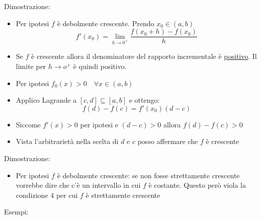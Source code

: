 Dimostrazione:
\begin{itemize}
	\item Per ipotesi $f$ è debolmente crescente. Prendo $x_0 \in  \left( a,b \right) $ 
	\[
	f'\left( x_0 \right) = \lim_{h \to 0^{+}} \frac{f\left( x_0+h \right) -f\left( x_0 \right)}{h}  
	\] 
	\item Se $f$ è crescente allora il denominatore del rapporto incrementale è \underline{positivo}. Il limite per $h \to o^{+}$ è quindi positivo.
\end{itemize}
\hr
\begin{itemize}
	\item Per ipotesi $f_0\left( x \right) > 0 \quad  \forall x \in  \left( a,b \right) $
	\item Applico Lagrande a $\left[ c,d \right] \subseteq \left[ a,b \right] $ e ottengo:
	\[
	f\left( d \right) - f\left( c \right) =f'\left( x_0 \right) \left( d-c \right) 
	\] 
	\item Siccome $f'\left( x \right) > 0$ per ipotesi e $\left( d-c \right) > 0$ allora $f\left( d \right) -f\left( c \right) > 0$
	\item Vista l'arbitrarietà nella scelta di $d$ e $c$ posso affermare che $f$ è crescente
\end{itemize}
Dimostrazione:
\begin{itemize}
	\item Per ipotesi $f$ è debolmente crescente: se non fosse strettamente crescente vorrebbe dire che c'è un intervallo in cui $f$ è costante. Questo però viola la condizione 4 per cui $f$ è strettamente crescente
\end{itemize}
Esempi:

